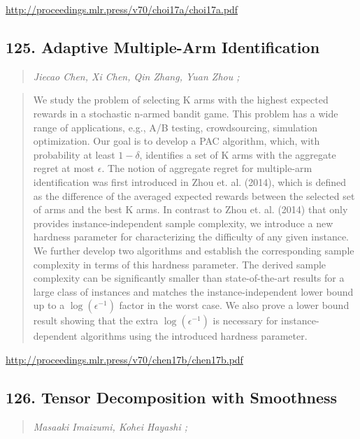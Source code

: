\documentclass{article}
\begin{document}
\href{http://proceedings.mlr.press/v70/choi17a/choi17a.pdf}{http://proceedings.mlr.press/v70/choi17a/choi17a.pdf}

\subsection{125. Adaptive Multiple-Arm Identification}

\begin{quote}
\footnotesize{\textit{Jiecao Chen, Xi Chen, Qin Zhang, Yuan Zhou ;}}

\end{quote}

\begin{quote}
    We study the problem of selecting K arms with the highest expected rewards in a stochastic n-armed bandit game. This problem has a wide range of applications, e.g., A/B testing, crowdsourcing, simulation optimization. Our goal is to develop a PAC algorithm, which, with probability at least $1-\delta$, identifies a set of K arms with the aggregate regret at most $\epsilon$. The notion of aggregate regret for multiple-arm identification was first introduced in Zhou et. al. (2014), which is defined as the difference of the averaged expected rewards between the selected set of arms and the best K arms. In contrast to Zhou et. al. (2014) that only provides instance-independent sample complexity, we introduce a new hardness parameter for characterizing the difficulty of any given instance. We further develop two algorithms and establish the corresponding sample complexity in terms of this hardness parameter. The derived sample complexity can be significantly smaller than state-of-the-art results for a large class of instances and matches the instance-independent lower bound up to a $\log(\epsilon^{-1})$ factor in the worst case. We also prove a lower bound result showing that the extra $\log(\epsilon^{-1})$ is necessary for instance-dependent algorithms using the introduced hardness parameter.  
\end{quote}

\href{http://proceedings.mlr.press/v70/chen17b/chen17b.pdf}{http://proceedings.mlr.press/v70/chen17b/chen17b.pdf}

\subsection{126. Tensor Decomposition with Smoothness}

\begin{quote}
\footnotesize{\textit{Masaaki Imaizumi, Kohei Hayashi ;}}

\end{quote}
\end{document}
